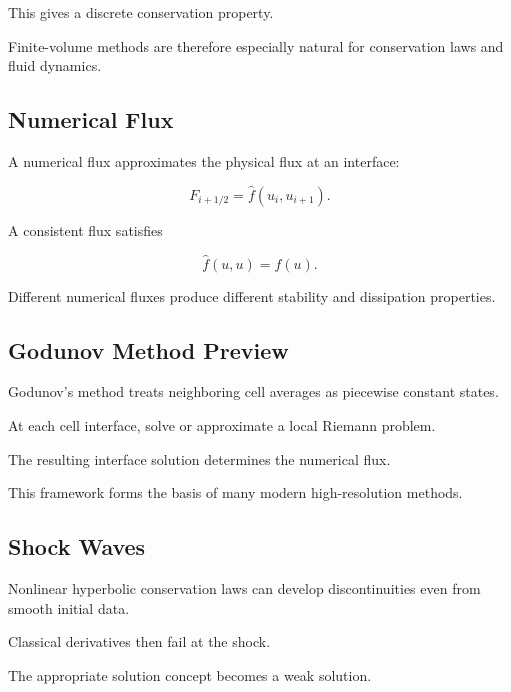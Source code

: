 This gives a discrete conservation property.

Finite-volume methods are therefore especially natural for conservation
laws and fluid dynamics.

\subsection{Numerical Flux}
\label{subsec:numerical-flux}

A numerical flux approximates the physical flux at an interface:

\[
\boxed{
F_{i+1/2}
=
\widehat{f}
(
u_i,
u_{i+1}
).
}
\]

A consistent flux satisfies

\[
\boxed{
\widehat{f}(u,u)=f(u).
}
\]

Different numerical fluxes produce different stability and dissipation
properties.

\subsection{Godunov Method Preview}
\label{subsec:godunov-method}

Godunov's method treats neighboring cell averages as piecewise constant
states.

At each cell interface, solve or approximate a local Riemann problem.

The resulting interface solution determines the numerical flux.

This framework forms the basis of many modern high-resolution methods.

\subsection{Shock Waves}
\label{subsec:numerical-shock-waves}

Nonlinear hyperbolic conservation laws can develop discontinuities even
from smooth initial data.

Classical derivatives then fail at the shock.

The appropriate solution concept becomes a weak solution.


